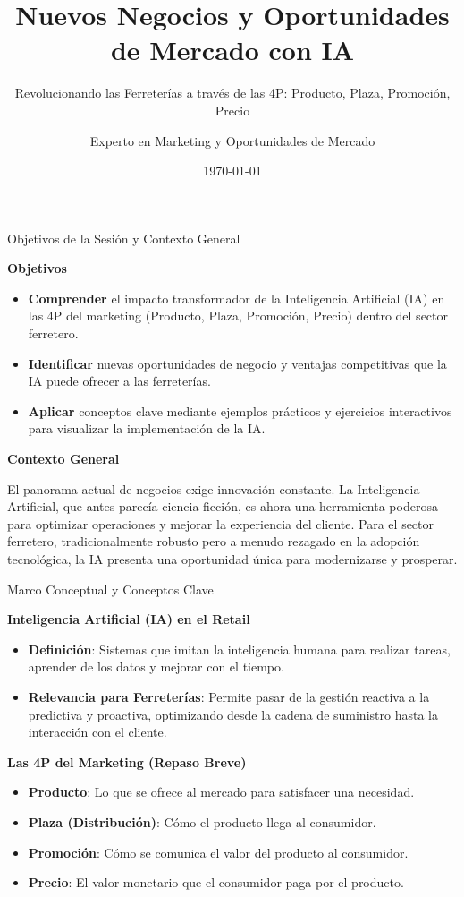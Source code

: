 \documentclass[aspectratio=169]{beamer}
\title[Nuevos Negocios y Oportunidade]{Nuevos Negocios y Oportunidades de Mercado con IA}
\subtitle{Revolucionando las Ferreterías a través de las 4P: Producto, Plaza, Promoción, Precio}
\author{Experto en Marketing y Oportunidades de Mercado}
\institute{Consultoría Estratégica para el Sector Ferretero}
\date{\today}
\begin{document}
\begin{frame}
  \titlepage
\end{frame}

\usebackgroundtemplate{}


\begin{frame}{Objetivos de la Sesión y Contexto General}


\textbf{Objetivos}

\begin{itemize}
  \item \textbf{Comprender} el impacto transformador de la Inteligencia Artificial (IA) en las 4P del marketing (Producto, Plaza, Promoción, Precio) dentro del sector ferretero.
  \item \textbf{Identificar} nuevas oportunidades de negocio y ventajas competitivas que la IA puede ofrecer a las ferreterías.
  \item \textbf{Aplicar} conceptos clave mediante ejemplos prácticos y ejercicios interactivos para visualizar la implementación de la IA.
\end{itemize}
\textbf{Contexto General}

El panorama actual de negocios exige innovación constante. La Inteligencia Artificial, que antes parecía ciencia ficción, es ahora una herramienta poderosa para optimizar operaciones y mejorar la experiencia del cliente. Para el sector ferretero, tradicionalmente robusto pero a menudo rezagado en la adopción tecnológica, la IA presenta una oportunidad única para modernizarse y prosperar.

\end{frame}

\begin{frame}{Marco Conceptual y Conceptos Clave}


\textbf{Inteligencia Artificial (IA) en el Retail}

\begin{itemize}
  \item \textbf{Definición}: Sistemas que imitan la inteligencia humana para realizar tareas, aprender de los datos y mejorar con el tiempo.
  \item \textbf{Relevancia para Ferreterías}: Permite pasar de la gestión reactiva a la predictiva y proactiva, optimizando desde la cadena de suministro hasta la interacción con el cliente.
\end{itemize}
\textbf{Las 4P del Marketing (Repaso Breve)}

\begin{itemize}
  \item \textbf{Producto}: Lo que se ofrece al mercado para satisfacer una necesidad.
  \item \textbf{Plaza (Distribución)}: Cómo el producto llega al consumidor.
  \item \textbf{Promoción}: Cómo se comunica el valor del producto al consumidor.
  \item \textbf{Precio}: El valor monetario que el consumidor paga por el producto.
\end{itemize}
\end{frame}
\end{document}
